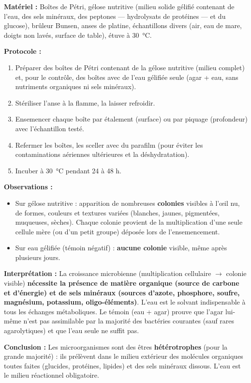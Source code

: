 \documentclass[11pt]{article}
\begin{document}
\begin{experience}
\textbf{Matériel :} Boîtes de Pétri, gélose nutritive (milieu solide gélifié contenant de l'eau, des sels minéraux, des peptones — hydrolysats de protéines — et du glucose), brûleur Bunsen, anses de platine, échantillons divers (air, eau de mare, doigts non lavés, surface de table), étuve à \SI{30}{\degreeCelsius}.

\textbf{Protocole :}
\begin{enumerate}
    \item Préparer des boîtes de Pétri contenant de la gélose nutritive (milieu complet) et, pour le contrôle, des boîtes avec de l'eau gélifiée seule (agar + eau, sans nutriments organiques ni sels minéraux).
    \item Stériliser l'anse à la flamme, la laisser refroidir.
    \item Ensemencer chaque boîte par étalement (surface) ou par piquage (profondeur) avec l'échantillon testé.
    \item Refermer les boîtes, les sceller avec du parafilm (pour éviter les contaminations aériennes ultérieures et la déshydratation).
    \item Incuber à \SI{30}{\degreeCelsius} pendant 24 à 48 h.
\end{enumerate}

\textbf{Observations :}
\begin{itemize}
    \item Sur gélose nutritive : apparition de nombreuses \textbf{colonies} visibles à l'œil nu, de formes, couleurs et textures variées (blanches, jaunes, pigmentées, muqueuses, sèches). Chaque colonie provient de la multiplication d'une seule cellule mère (ou d'un petit groupe) déposée lors de l'ensemencement.
    \item Sur eau gélifiée (témoin négatif) : \textbf{aucune colonie} visible, même après plusieurs jours.
\end{itemize}

\textbf{Interprétation :}
La croissance microbienne (multiplication cellulaire $\rightarrow$ colonie visible) \textbf{nécessite la présence de matière organique (source de carbone et d'énergie) et de sels minéraux (sources d'azote, phosphore, soufre, magnésium, potassium, oligo-éléments)}. L'eau est le solvant indispensable à tous les échanges métaboliques. Le témoin (eau + agar) prouve que l'agar lui-même n'est pas assimilable par la majorité des bactéries courantes (sauf rares agarolytiques) et que l'eau seule ne suffit pas.

\textbf{Conclusion :} Les microorganismes sont des êtres \textbf{hétérotrophes} (pour la grande majorité) : ils prélèvent dans le milieu extérieur des molécules organiques toutes faites (glucides, protéines, lipides) et des sels minéraux dissous. L'eau est le milieu réactionnel obligatoire.
\end{experience}
\end{document}
